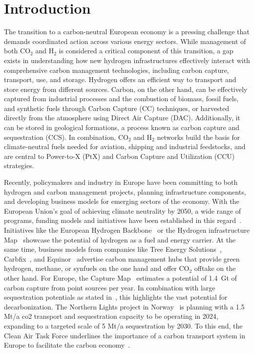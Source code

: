\documentclass[twocolumn]{article}
\newcommand{\carbon}{CO$_2$}
\newcommand{\hydrogen}{H$_2$}
\begin{document}
\section{Introduction}

The transition to a carbon-neutral European economy is a pressing challenge that demands coordinated action across various energy sectors. While management of both \carbon{} and \hydrogen{} is considered a critical component of this transition, a gap exists in understanding how new hydrogen infrastructures effectively interact with comprehensive carbon management technologies, including carbon capture, transport, use, and storage. Hydrogen offers an efficient way to transport and store energy from different sources. Carbon, on the other hand, can be effectively captured from industrial processes and the combustion of biomass, fossil fuels, and synthetic fuels through Carbon Capture (CC) techniques, or harvested directly from the atmosphere using Direct Air Capture (DAC). Additionally, it can be stored in geological formations, a process known as carbon capture and sequestration (CCS). In combination, \carbon{} and \hydrogen{} networks build the basis for climate-neutral fuels needed for aviation, shipping and industrial feedstocks, and are central to Power-to-X (PtX) and Carbon Capture and Utilization (CCU) strategies.

Recently, policymakers and industry in Europe have been committing to both hydrogen and carbon management projects, planning infrastructure components, and developing business models for emerging sectors of the economy. With the European Union's goal of achieving climate neutrality by 2050, a wide range of programs, funding models and initiatives have been established in this regard~\cite{eu2023netzero,europeangreendeal,europeaninnovationfund}. Initiatives like the European Hydrogen Backbone~\cite{gasforclimateEuropeanHydrogenBackbone2022} or the Hydrogen infrastructure Map~\cite{H2InfrastructureMap} showcase the potential of hydrogen as a fuel and energy carrier. At the same time, business models from companies like Tree Energy Solutions~\cite{TESHydrogenLife2023}, Carbfix~\cite{WeTurnCO2}, and Equinor~\cite{adomaitisEquinorRWEBuild2023} advertise carbon management hubs that provide green hydrogen, methane, or synfuels on the one hand and offer \carbon{} offtake on the other hand. For Europe, the Capture Map~\cite{ToolsGreenTransition} estimates a potential of 1.4~Gt of carbon capture from point sources per year. In combination with large sequestration potentials as stated in~\cite{weiProposedGlobalLayout2021}, this highlights the vast potential for decarbonization. The Northern Lights project in Norway~\cite{NorthernLightsWhat} is planning with a 1.5 Mt/a co2 transport and sequestration capacity to be operating in 2024, expanding to a targeted scale of 5 Mt/a sequestration by 2030.
To this end, the Clean Air Task Force underlines the importance of a carbon transport system in Europe to facilitate the carbon economy~\cite{lockwoodEuropeanStrategyCarbon}.
\end{document}
